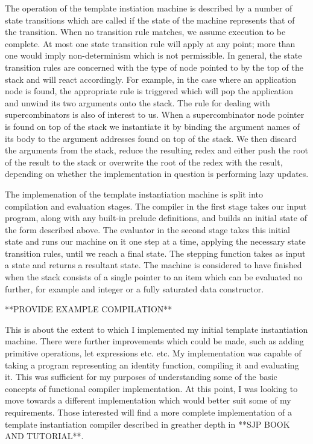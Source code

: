 The operation of the template instiation machine is described
by a number of state transitions which are called if the state
of the machine represents that of the transition. When no
transition rule matches, we assume execution to be complete. 
At most one state transition rule will apply at any point;
more than one would imply non-determinism which is not
permissible. In general, the state transition rules are
concerned with the type of node pointed to by the top of the
stack and will react accordingly. For example, in the case
where an application node is found, the appropriate rule
is triggered which will pop the application and unwind its
two arguments onto the stack. The rule for dealing with 
supercombinators is also of interest to us. When a 
supercombinator node pointer is found on top of the stack
we instantiate it by binding the argument names of its
body to the argument addresses found on top of the stack.
We then discard the arguments from the stack, reduce the
resulting redex and either push the root of the result 
to the stack or overwrite the root of the redex with the
result, depending on whether the implementation in question
is performing lazy updates. 

The implemenation of the template instantiation machine is
split into compilation and evaluation stages. The compiler
in the first stage takes our input program, along with
any built-in prelude definitions, and builds an initial
state of the form described above. The evaluator in the 
second stage takes this initial state and runs our machine
on it one step at a time, applying the necessary state
transition rules, until we reach a final state. The stepping
function takes as input a state and returns a resultant
state. The machine is considered to have finished when 
the stack consists of a single pointer to an item which
can be evaluated no further, for example and integer or
a fully saturated data constructor. 

**PROVIDE EXAMPLE COMPILATION**

This is about the extent to which I implemented my initial
template instantiation machine. There were further 
improvements which could be made, such as adding primitive
operations, let expressions etc. etc. My implementation was
capable of taking a program representing an identity 
function, compiling it and evaluating it. This was 
sufficient for my purposes of understanding some of the
basic concepts of functional compiler implementation. At
this point, I was looking to move towards a different
implementation which would better suit some of my 
requirements. Those interested will find a more complete
implementation of a template instantiation compiler 
described in greather depth in **SJP BOOK AND TUTORIAL**.


